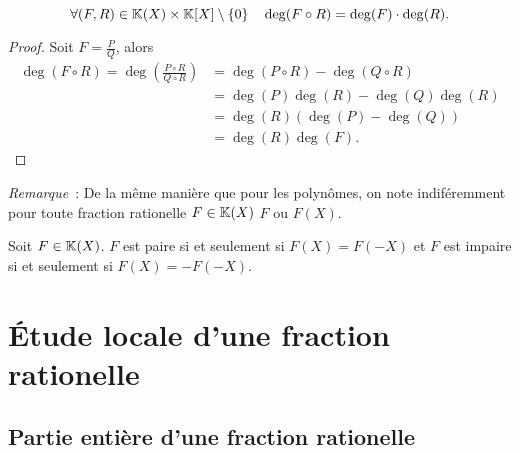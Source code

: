 \begin{prop}
  \begin{equation}
    \forall (F,R) \in \mathbb{K}(X)\times\mathbb{K}[X]\setminus\{0\} \quad \deg(F \circ R)=\deg(F) \cdot \deg(R).
  \end{equation}
\end{prop}
\begin{proof}
  Soit $F=\frac{P}{Q}$, alors
  \begin{align}
    \deg(F \circ R) = \deg\left(\frac{P \circ R}{Q \circ R}\right) &= \deg(P\circ R) - \deg(Q\circ R) \\
    &=\deg(P)\deg(R)-\deg(Q)\deg(R)\\
    &=\deg(R)(\deg(P)-\deg(Q))\\
    &=\deg(R)\deg(F).
  \end{align}
\end{proof}

\emph{Remarque}~: De la même manière que pour les polynômes, on note indiféremment pour toute fraction rationelle $F \in \mathbb{K}(X)$ $F$ ou $F(X)$.

\begin{defdef}
  Soit $F \in \mathbb{K}(X)$. $F$ est paire si et seulement si $F(X)=F(-X)$ et $F$ est impaire si et seulement si $F(X)=-F(-X)$.
\end{defdef}

\section{Étude locale d'une fraction rationelle}

\subsection{Partie entière d'une fraction rationelle}

